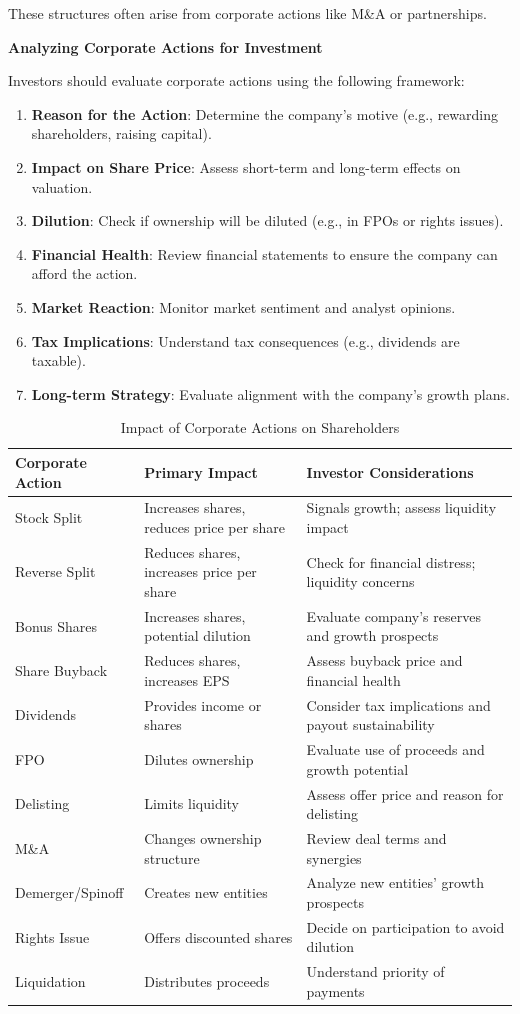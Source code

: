 \documentclass[12pt]{article}
\begin{document}
These structures often arise from corporate actions like M\&A or partnerships.

\textbf{Analyzing Corporate Actions for Investment}

Investors should evaluate corporate actions using the following framework:

\begin{enumerate}
    \item \textbf{Reason for the Action}: Determine the company's motive (e.g., rewarding shareholders, raising capital).
    \item \textbf{Impact on Share Price}: Assess short-term and long-term effects on valuation.
    \item \textbf{Dilution}: Check if ownership will be diluted (e.g., in FPOs or rights issues).
    \item \textbf{Financial Health}: Review financial statements to ensure the company can afford the action.
    \item \textbf{Market Reaction}: Monitor market sentiment and analyst opinions.
    \item \textbf{Tax Implications}: Understand tax consequences (e.g., dividends are taxable).
    \item \textbf{Long-term Strategy}: Evaluate alignment with the company's growth plans.
\end{enumerate}

\begin{table}[h]
\centering
\caption{Impact of Corporate Actions on Shareholders}
\begin{tabular}{l p{6cm} p{6cm}}
\hline
\textbf{Corporate Action} & \textbf{Primary Impact} & \textbf{Investor Considerations} \\
\hline
Stock Split & Increases shares, reduces price per share & Signals growth; assess liquidity impact \\
Reverse Split & Reduces shares, increases price per share & Check for financial distress; liquidity concerns \\
Bonus Shares & Increases shares, potential dilution & Evaluate company's reserves and growth prospects \\
Share Buyback & Reduces shares, increases EPS & Assess buyback price and financial health \\
Dividends & Provides income or shares & Consider tax implications and payout sustainability \\
FPO & Dilutes ownership & Evaluate use of proceeds and growth potential \\
Delisting & Limits liquidity & Assess offer price and reason for delisting \\
M\&A & Changes ownership structure & Review deal terms and synergies \\
Demerger/Spinoff & Creates new entities & Analyze new entities' growth prospects \\
Rights Issue & Offers discounted shares & Decide on participation to avoid dilution \\
Liquidation & Distributes proceeds & Understand priority of payments \\
\hline
\end{tabular}
\end{table}
\end{document}
